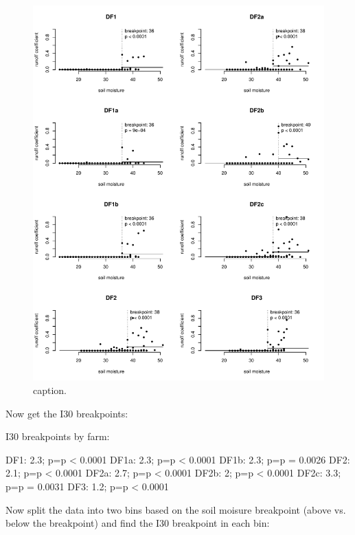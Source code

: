 \documentclass[12pt]{article}
\begin{document}
\begin{figure}
    \begin{center}
\includegraphics{runoff_constants-sm}
    \end{center}
    \caption{caption.\label{sm}}
\end{figure}


Now get the I30 breakpoints:\\

\begin{Schunk}
\begin{Soutput}
I30 breakpoints by farm:
\end{Soutput}
\begin{Soutput}
DF1: 2.3; p=p < 0.0001
DF1a: 2.3; p=p < 0.0001
DF1b: 2.3; p=p = 0.0026
DF2: 2.1; p=p < 0.0001
DF2a: 2.7; p=p < 0.0001
DF2b: 2; p=p < 0.0001
DF2c: 3.3; p=p = 0.0031
DF3: 1.2; p=p < 0.0001
\end{Soutput}
\end{Schunk}

Now split the data into two bins based on the soil moisure breakpoint (above vs. below the breakpoint) and find the I30 breakpoint in each bin:\\
\end{document}
